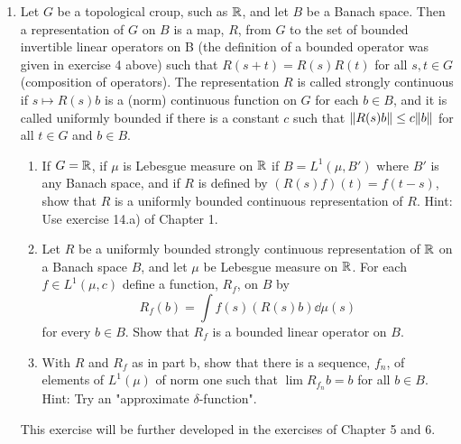 \begin{enumerate}[label=\arabic*)]
\item Let $G$ be a topological croup, such as $\mathbb{R}$, and let $B$ be a Banach space. Then a representation of $G$ on $B$ is a map, $R$, from $G$ to the set of bounded invertible linear operators on B (the definition of a bounded operator was given in exercise 4 above) such that $R(s+t)=R(s)R(t)$ for all $s,t\in G$ (composition of operators). The representation $R$ is called strongly continuous if $s\mapsto R(s)b$ is a (norm) continuous function on $G$ for each $b\in B$, and it is called uniformly bounded if there is a constant $c$ such that $\norm{R(s)b}\leq c\norm{b}$ for all $t\in G$ and $b\in B$.

\begin{enumerate}[label=\alph*)]
    \item If $G=\mathbb{R}$, if $\mu$ is Lebesgue measure on $\mathbb{R}$ if $B=L^1(\mu,B')$ where $B'$ is any Banach space, and if $R$ is defined by $(R(s)f)(t)=f(t-s)$, show that $R$ is a uniformly bounded continuous representation of $R$. Hint: Use exercise 14.a) of Chapter 1.
    
    \item Let $R$ be a uniformly bounded strongly continuous representation of $\mathbb{R}$ on a Banach space $B$, and let $\mu$ be Lebesgue measure on $\mathbb{R}$. For each $f\in L^1(\mu,c)$ define a function, $R_f$, on $B$ by $$R_f(b)=\int f(s)(R(s)b)\dd\mu(s)$$ for every $b \in B$. Show that $R_f$ is a bounded linear operator on $B$.

    \item With $R$ and $R_f$ as in part b, show that there is a sequence, $f_n$, of elements of $L^1(\mu)$ of norm one such that $\lim R_{f_n} b=b$ for all $b\in B$. Hint: Try an "approximate $\delta$-function".
\end{enumerate}
This exercise will be further developed in the exercises of Chapter 5 and 6.
\end{enumerate}